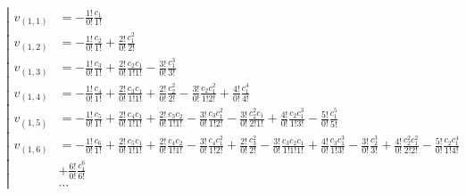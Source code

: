 \begin{equation*}
\left|
\begin{aligned}
v_{(1,1)} 
&= 
- \frac{1!}{0!} \frac{c_1}{1!} \\ 
v_{(1,2)} 
&= 
- \frac{1!}{0!} \frac{c_2}{1!} 
+ \frac{2!}{0!} \frac{c_1^2}{2!} \\
v_{(1,3)} 
&= 
- \frac{1!}{0!} \frac{c_3}{1!} 
+ \frac{2!}{0!} \frac{c_2 c_1}{1!1!} 
- \frac{3!}{0!} \frac{c_1^3}{3!} \\
v_{(1,4)}
&= 
- \frac{1!}{0!} \frac{c_4}{1!} 
+ \frac{2!}{0!} \frac{c_3 c_1}{1!1!} 
+ \frac{2!}{0!} \frac{c_2^2}{2!}
- \frac{3!}{0!} \frac{c_2 c_1^2}{1!2!}
+ \frac{4!}{0!} \frac{c_1^4}{4!} \\
v_{(1,5)}
&=
- \frac{1!}{0!} \frac{c_5}{1!} 
+ \frac{2!}{0!} \frac{c_4 c_1}{1!1!} 
+ \frac{2!}{0!} \frac{c_3 c_2}{1!1!}
- \frac{3!}{0!} \frac{c_3 c_1^2}{1!2!}
- \frac{3!}{0!} \frac{c_2^2 c_1}{2!1!}
+ \frac{4!}{0!} \frac{c_2 c_1^3}{1!3!}
- \frac{5!}{0!} \frac{c_1^5}{5!} \\
v_{(1,6)}
&=
- \frac{1!}{0!} \frac{c_6}{1!} 
+ \frac{2!}{0!} \frac{c_5 c_1}{1!1!} 
+ \frac{2!}{0!} \frac{c_4 c_2}{1!1!}
- \frac{3!}{0!} \frac{c_4 c_1^2}{1!2!}
+ \frac{2!}{0!} \frac{c_3^2}{2!}
- \frac{3!}{0!} \frac{c_3 c_2 c_1}{1!1!1!}
+ \frac{4!}{0!} \frac{c_3 c_1^3}{1!3!}
- \frac{3!}{0!} \frac{c_2^3}{3!}
+ \frac{4!}{0!} \frac{c_2^2 c_1^2}{2!2!}
- \frac{5!}{0!} \frac{c_2 c_1^4}{1!4!} \\
&
+ \frac{6!}{0!} \frac{c_1^6}{6!} \\
&\ldots
\end{aligned}
\right.
\end{equation*}

